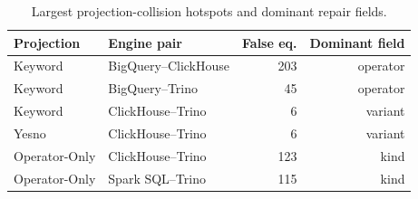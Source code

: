 \begin{table}[H]
\centering
\caption{Largest projection-collision hotspots and dominant repair fields.}
\label{tab:repair-hotspots}
\small
\begin{tabular}{llrr}
\toprule
Projection & Engine pair & False eq. & Dominant field \\
\midrule
Keyword & BigQuery--ClickHouse & 203 & operator \\
Keyword & BigQuery--Trino & 45 & operator \\
Keyword & ClickHouse--Trino & 6 & variant \\
Yesno & ClickHouse--Trino & 6 & variant \\
Operator-Only & ClickHouse--Trino & 123 & kind \\
Operator-Only & Spark SQL--Trino & 115 & kind \\
\bottomrule
\end{tabular}
\end{table}
